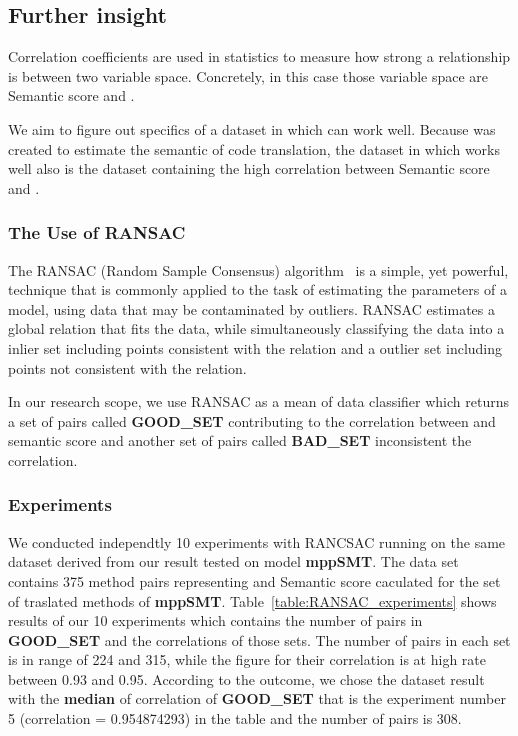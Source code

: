 \subsection{Further insight}

Correlation coefficients are used in statistics to measure how strong a relationship is between two variable space. Concretely, in this case those variable space are Semantic score and {\model}. 


We aim to figure out specifics of a dataset in which {\model} can work well. Because {\model} was created to estimate the semantic of code translation, the dataset in which {\model} works well also is the dataset containing the high correlation between Semantic score and {\model}. 

\subsubsection{The Use of RANSAC}
The RANSAC (Random Sample Consensus) algorithm~\cite{ Fischler:1981:RSC:358669.358692} is a simple, yet powerful, technique that is commonly applied to the task of estimating the parameters of a model, using data that may be contaminated by outliers. RANSAC estimates a global relation that fits the data, while simultaneously classifying the data into a inlier set including points consistent with the relation and a outlier set including points not consistent with the relation. 




In our research scope, we use RANSAC as a mean of data classifier which returns a set of pairs called \textbf{GOOD\_SET} contributing to the correlation between {\model} and semantic score and another set of pairs called \textbf{BAD\_SET} inconsistent the correlation.

\subsubsection{Experiments}
We conducted independtly 10 experiments with RANCSAC running on the same dataset derived from our result tested on model \textbf{mppSMT}. The data set contains 375 method pairs representing {\model} and Semantic score caculated for the set of traslated methods of \textbf{mppSMT}. Table~\ref{table:RANSAC_experiments} shows results of our 10 experiments which contains the number of pairs in \textbf{GOOD\_SET} and the correlations of those sets. The number of pairs in each set is in range of 224 and 315, while the figure for their correlation is at high rate between 0.93 and 0.95. 
According to the outcome, we chose the dataset result with the \textbf{median} of correlation of \textbf{GOOD\_SET} that is the experiment number 5 (correlation = 0.954874293) in the table and the number of pairs is 308.

